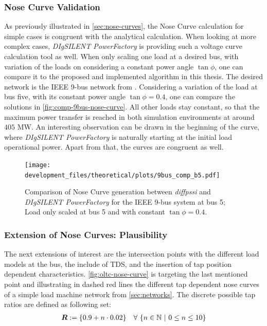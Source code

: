 \subsubsection{Nose Curve Validation}

As previously illustrated in \autoref{sec:nose-curves}, the Nose Curve calculation for simple cases is congruent with the analytical calculation.
When looking at more complex cases, \textit{DIgSILENT PowerFactory} is providing such a voltage curve calculation tool as well.
When only scaling one load at a desired bus, with variation of the loads on considering a constant power angle $\tan \phi$, one can compare it to the proposed and implemented algorithm in this thesis.
The desired network is the IEEE 9-bus network from \autocite{anderson_2003}.
Considering a variation of the load at bus five, with its constant power angle $\tan \phi = 0.4$, one can compare the solutions in \autoref{fig:comp-9bus-nose-curve}.
All other loads stay constant, so that the maximum power transfer is reached in both simulation environments at around $405$ MW.
An interesting observation can be drawn in the beginning of the curve, where \textit{DIgSILENT PowerFactory} is naturally starting at the initial load operational power.
Apart from that, the curves are congruent as well.

\begin{figure}[htbp!]
    \centering
    \texttt{[image: development\_files/theoretical/plots/9bus\_comp\_b5.pdf]}
    \caption[Comparison of Nose Curve generation between \textit{diffpssi} and \textit{DIgSILENT PowerFactory} for the IEEE 9-bus system]{Comparison of Nose Curve generation between \textit{diffpssi} and \textit{DIgSILENT PowerFactory} for the IEEE 9-bus system at bus 5; Load only scaled at bus 5 and with constant $\tan \phi = 0.4$.}
    \label{fig:comp-9bus-nose-curve}
\end{figure}

\subsubsection{Extension of Nose Curves: Plausibility}

The next extensions of interest are the intersection points with the different load models at the bus, the include of \acs{TDS}, and the insertion of tap position dependent characteristics.
\autoref{fig:oltc-nose-curve} is targeting the last mentioned point and illustrating in dashed red lines the different tap dependent nose curves of a simple load machine network from \autoref{sec:networks}.
The discrete possible tap ratios are defined as following set:
\begin{align}
    \boldsymbol{R} := \{0.9 + n \cdot 0.02\} \quad \forall~\{ n \in \mathbb{N}~\vert~0 \leq n \leq 10 \} \notag
\end{align}

